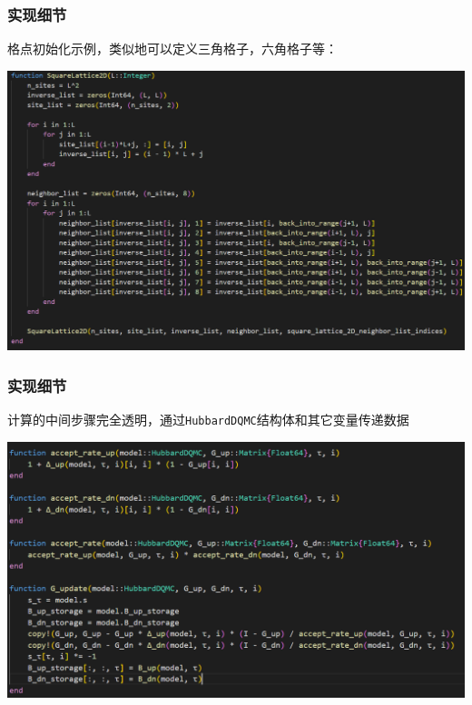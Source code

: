 \documentclass[UTF8]{ctexbeamer}
\begin{document}
\begin{frame}
\frametitle{实现细节}

格点初始化示例，类似地可以定义三角格子，六角格子等：

\includegraphics[width=\textwidth]{lattice-initialize.PNG}

\end{frame}

\begin{frame}
\frametitle{实现细节}

计算的中间步骤完全透明，通过\texttt{HubbardDQMC}结构体和其它变量传递数据

\begin{center}
    \includegraphics[width=\textwidth]{update-example-1.PNG}
\end{center}

\end{frame}
\end{document}
